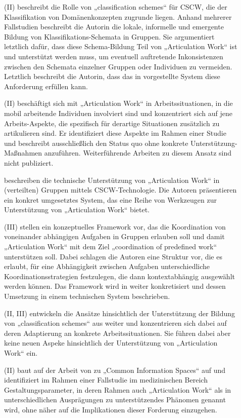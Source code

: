 \begin{description}
	\item[\citet{Simone00}] (II) beschreibt die Rolle von „classification schemes“ für \gls{CSCW}, die der Klassifikation von Domänenkonzepten zugrunde liegen. Anhand mehrerer Fallstudien beschreibt die Autorin die lokale, informelle und emergente Bildung von Klassifikations-Schemata in Gruppen. Sie argumentiert letztlich dafür, dass diese Schema-Bildung Teil von „Articulation Work“ ist und unterstützt werden muss, um eventuell auftretende Inkonsistenzen zwischen den Schemata einzelner Gruppen oder Individuen zu vermeiden. Letztlich beschreibt die Autorin, dass das in \citep{Simone99} vorgestellte System diese Anforderung erfüllen kann. 
	\item[\citet{Christensen01}] (II) beschäftigt sich mit „Articulation Work“ in Arbeitssituationen, in die mobil arbeitende Individuen involviert sind und konzentriert sich auf jene Arbeits-Aspekte, die spezifisch für derartige Situationen zusätzlich zu artikulieren sind. Er identifiziert diese Aspekte im Rahmen einer Studie und beschreibt ausschließlich den Status quo ohne konkrete Unterstützung-Maßnahmen anzuführen. Weiterführende Arbeiten zu diesem Ansatz sind nicht publiziert.
	\item[\citet{Fuchs01}] beschreiben die technische Unterstützung von „Articulation Work“ in (verteilten) Gruppen mittels \gls{CSCW}-Technologie. Die Autoren präsentieren ein konkret umgesetztes System, das eine Reihe von Werkzeugen zur Unterstützung von „Articulation Work“ bietet.
	\item[\citet{Raposo01}] (III) stellen ein konzeptuelles Framework vor, das die Koordination von voneinander abhängigen Aufgaben in Gruppen erlauben soll und damit „Articulation Work“ mit dem Ziel „coordination of predefined work“ unterstützen soll. Dabei schlagen die Autoren eine Struktur vor, die es erlaubt, für eine Abhängigkeit zwischen Aufgaben unterschiedliche Koordinationsstrategien festzulegen, die dann kontextabhängig ausgewählt werden können. Das Framework wird in \citep{Raposo02} weiter konkretisiert und dessen Umsetzung in einem technischen System beschrieben.
	\item[\citet{Simone01}] (II, III) entwickeln die Ansätze hinsichtlich der Unterstützung der Bildung von „classification schemes“ aus \citep{Simone00} weiter und konzentrieren sich dabei auf deren Adaptierung an konkrete Arbeitssituationen. Sie führen dabei aber keine neuen Aspeke hinsichtlich der Unterstützung von „Articulation Work“ ein.
	\item[\citet{Bossen02}] (II) baut auf der Arbeit von \citep{Bannon97} zu „Common Information Spaces“ auf und identifiziert im Rahmen einer Fallstudie im medizinischen Bereich Gestaltungsparameter, in deren Rahmen auch „Articulation Work“ als in unterschiedlichen Ausprägungen zu unterstützendes Phänomen genannt wird, ohne näher auf die Implikationen dieser Forderung einzugehen.

\end{description}
